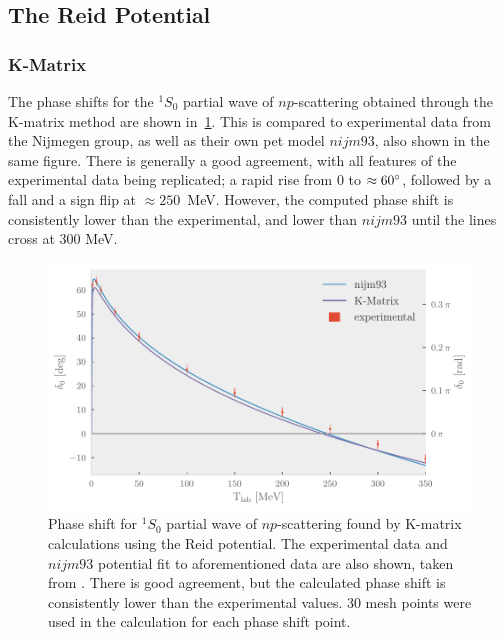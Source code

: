 \subsection{The Reid Potential}


\subsubsection{K-Matrix}
The phase shifts for the \(^{1}S_{0}\) partial wave of \(np\)-scattering
obtained through the K-matrix method are shown 
in~\cref{fig:kmatrix}. This is compared to experimental data from the Nijmegen
group, as well as their own pet model \(nijm93\)\cite{PhysRevC.48.792}, also shown in the same figure. There is generally a
good agreement, with all features of the experimental data being replicated; a
rapid rise from 0 to \(\approx 60\degree\), followed by a fall and a sign flip
at \mbox{\(\approx 250\) MeV}. However, the computed phase shift is consistently lower
than the experimental, and lower than \(nijm93\) until the lines cross at
\(300\) MeV.

\begin{figure}[ht!]
  \centering
  \includegraphics[]{Figures/kmatrix.pdf}
  \caption{\label{fig:kmatrix}Phase shift for \(^{1}S_{0}\) partial wave of
    \(np\)-scattering found by K-matrix calculations using the Reid potential. The experimental data and \(nijm93\) potential fit to
    aforementioned data are also shown, taken from\cite{PhysRevC.48.792}
. There is good agreement, but the
  calculated phase shift is consistently lower than the experimental
  values. 30 mesh points were used in the calculation for each phase shift point.}
\end{figure}

